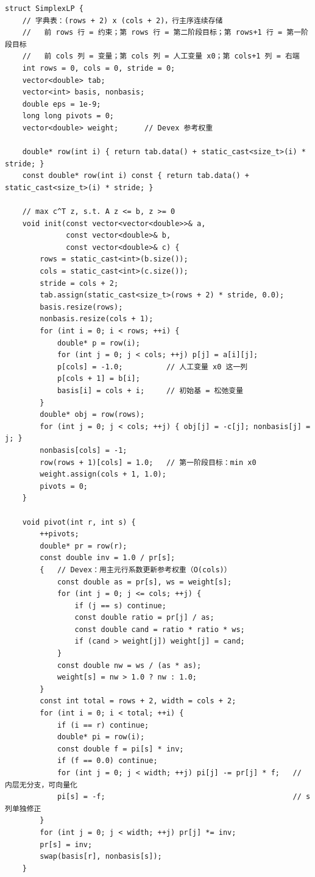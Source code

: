 		\begin{verbatim}
struct SimplexLP {
    // 字典表：(rows + 2) x (cols + 2)，行主序连续存储
    //   前 rows 行 = 约束；第 rows 行 = 第二阶段目标；第 rows+1 行 = 第一阶段目标
    //   前 cols 列 = 变量；第 cols 列 = 人工变量 x0；第 cols+1 列 = 右端
    int rows = 0, cols = 0, stride = 0;
    vector<double> tab;
    vector<int> basis, nonbasis;
    double eps = 1e-9;
    long long pivots = 0;
    vector<double> weight;      // Devex 参考权重

    double* row(int i) { return tab.data() + static_cast<size_t>(i) * stride; }
    const double* row(int i) const { return tab.data() + static_cast<size_t>(i) * stride; }

    // max c^T z, s.t. A z <= b, z >= 0
    void init(const vector<vector<double>>& a,
              const vector<double>& b,
              const vector<double>& c) {
        rows = static_cast<int>(b.size());
        cols = static_cast<int>(c.size());
        stride = cols + 2;
        tab.assign(static_cast<size_t>(rows + 2) * stride, 0.0);
        basis.resize(rows);
        nonbasis.resize(cols + 1);
        for (int i = 0; i < rows; ++i) {
            double* p = row(i);
            for (int j = 0; j < cols; ++j) p[j] = a[i][j];
            p[cols] = -1.0;          // 人工变量 x0 这一列
            p[cols + 1] = b[i];
            basis[i] = cols + i;     // 初始基 = 松弛变量
        }
        double* obj = row(rows);
        for (int j = 0; j < cols; ++j) { obj[j] = -c[j]; nonbasis[j] = j; }
        nonbasis[cols] = -1;
        row(rows + 1)[cols] = 1.0;   // 第一阶段目标：min x0
        weight.assign(cols + 1, 1.0);
        pivots = 0;
    }

    void pivot(int r, int s) {
        ++pivots;
        double* pr = row(r);
        const double inv = 1.0 / pr[s];
        {   // Devex：用主元行系数更新参考权重（O(cols)）
            const double as = pr[s], ws = weight[s];
            for (int j = 0; j <= cols; ++j) {
                if (j == s) continue;
                const double ratio = pr[j] / as;
                const double cand = ratio * ratio * ws;
                if (cand > weight[j]) weight[j] = cand;
            }
            const double nw = ws / (as * as);
            weight[s] = nw > 1.0 ? nw : 1.0;
        }
        const int total = rows + 2, width = cols + 2;
        for (int i = 0; i < total; ++i) {
            if (i == r) continue;
            double* pi = row(i);
            const double f = pi[s] * inv;
            if (f == 0.0) continue;
            for (int j = 0; j < width; ++j) pi[j] -= pr[j] * f;   // 内层无分支，可向量化
            pi[s] = -f;                                           // s 列单独修正
        }
        for (int j = 0; j < width; ++j) pr[j] *= inv;
        pr[s] = inv;
        swap(basis[r], nonbasis[s]);
    }


\end{verbatim}
